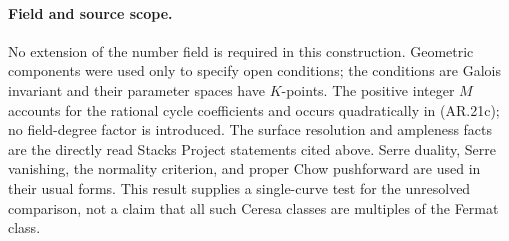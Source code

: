 \paragraph{Field and source scope.}
No extension of the number field is required in this construction.
Geometric components were used only to specify open conditions; the
conditions are Galois invariant and their parameter spaces have
$K$-points.  The positive integer $M$ accounts for the rational cycle
coefficients and occurs quadratically in (AR.21c); no field-degree
factor is introduced.  The surface resolution and ampleness facts
are the directly read Stacks Project statements cited above.  Serre
duality, Serre vanishing, the normality criterion, and proper Chow
pushforward are used in their usual forms.  This result supplies a
single-curve test for the unresolved comparison, not a claim that
all such Ceresa classes are multiples of the Fermat class.
